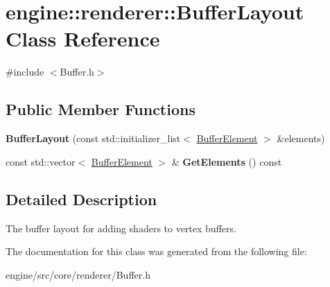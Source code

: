 \hypertarget{classengine_1_1renderer_1_1BufferLayout}{}\section{engine\+:\+:renderer\+:\+:Buffer\+Layout Class Reference}
\label{classengine_1_1renderer_1_1BufferLayout}


{\ttfamily \#include $<$Buffer.\+h$>$}

\subsection*{Public Member Functions}
\begin{DoxyCompactItemize}
\item
\mbox{\label{classengine_1_1renderer_1_1BufferLayout_aad7d69ca7a55c528fd619bc2f51635f0}}
{\bfseries Buffer\+Layout} (const std\+::initializer\+\_\+list$<$ \hyperlink{structengine_1_1renderer_1_1BufferElement}{Buffer\+Element} $>$ \&elements)
\item
\mbox{\label{classengine_1_1renderer_1_1BufferLayout_aed5ee70b0eeef0dd0695f98e2e08a979}}
const std\+::vector$<$ \hyperlink{structengine_1_1renderer_1_1BufferElement}{Buffer\+Element} $>$ \& {\bfseries Get\+Elements} () const
\end{DoxyCompactItemize}


\subsection{Detailed Description}
The buffer layout for adding shaders to vertex buffers.

The documentation for this class was generated from the following file\+:\begin{DoxyCompactItemize}
\item
engine/src/core/renderer/Buffer.\+h\end{DoxyCompactItemize}
